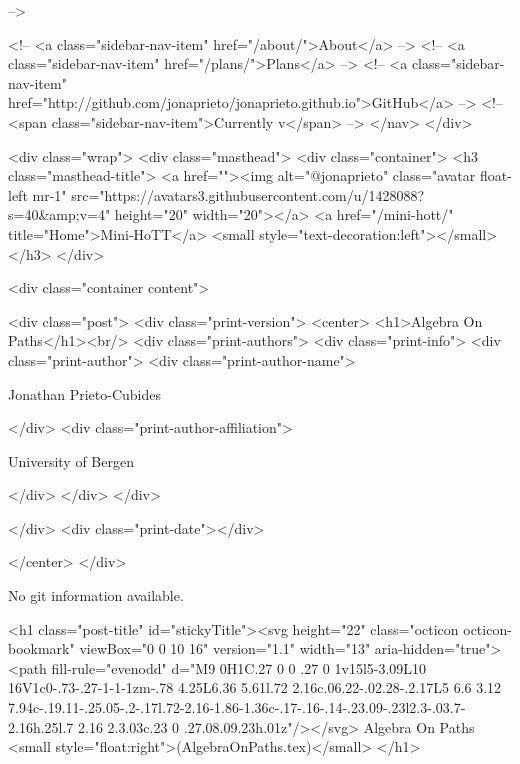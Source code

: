       
     -->

    <!-- <a class="sidebar-nav-item" href="/about/">About</a> -->
    <!-- <a class="sidebar-nav-item" href="/plans/">Plans</a> -->
    <!-- <a class="sidebar-nav-item" href="http://github.com/jonaprieto/jonaprieto.github.io">GitHub</a> -->
    <!-- <span class="sidebar-nav-item">Currently v</span> -->
  </nav>
</div>

    <div class="wrap">
      <div class="masthead">
        <div class="container">
          <h3 class="masthead-title">
            <a href=""><img alt="@jonaprieto" class="avatar float-left mr-1" src="https://avatars3.githubusercontent.com/u/1428088?s=40&amp;v=4" height="20" width="20"></a>
            <a href="/mini-hott/" title="Home">Mini-HoTT</a>
            <small style="text-decoration:left"></small>
          </h3>
        </div>
      
      <div class="container content">
        







<div class="post">
  <div class="print-version">
    <center>
      <h1>Algebra On Paths</h1><br/>
        <div class="print-authors">
          <div class="print-info">
            <div class="print-author">
              <div class="print-author-name">
                
                  Jonathan Prieto-Cubides
                
              </div>
              <div class="print-author-affiliation">
                
                  University of Bergen
                
                </div>
            </div>
          </div>
          
          
        </div>
        <div class="print-date"></div>
        
        
    </center>
  </div>

  
  No git information available.
  

  <h1 class="post-title" id="stickyTitle"><svg height="22" class="octicon octicon-bookmark" viewBox="0 0 10 16" version="1.1" width="13" aria-hidden="true"><path fill-rule="evenodd" d="M9 0H1C.27 0 0 .27 0 1v15l5-3.09L10 16V1c0-.73-.27-1-1-1zm-.78 4.25L6.36 5.61l.72 2.16c.06.22-.02.28-.2.17L5 6.6 3.12 7.94c-.19.11-.25.05-.2-.17l.72-2.16-1.86-1.36c-.17-.16-.14-.23.09-.23l2.3-.03.7-2.16h.25l.7 2.16 2.3.03c.23 0 .27.08.09.23h.01z"/></svg> Algebra On Paths <small style="float:right">(AlgebraOnPaths.tex)</small>
  </h1>

